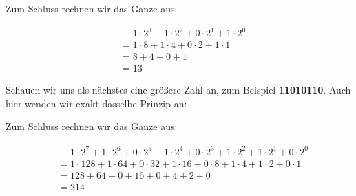 \documentclass{article}
\begin{document}
Zum Schluss rechnen wir das Ganze aus:

\begin{center}
\begin{align*}
  &\phantom{= } 1 \cdot 2^3 + 1 \cdot 2^2 + 0 \cdot 2^1 + 1 \cdot 2^0 \\
  &= 1 \cdot 8 + 1 \cdot 4 + 0 \cdot 2 + 1 \cdot 1 \\
  &= 8 + 4 + 0 + 1 \\
  &= 13
\end{align*}
\end{center}


Schauen wir uns als nächstes eine größere Zahl an, zum Beispiel \textbf{11010110}. Auch hier wenden wir exakt dasselbe Prinzip an:

\begin{center}
\end{center}

Zum Schluss rechnen wir das Ganze aus:

\begin{center}
\begin{align*}
  &\phantom{= } 1 \cdot 2^7 +1 \cdot 2^6 + 0 \cdot 2^5 + 1 \cdot 2^4 + 0 \cdot 2^3 + 1 \cdot 2^2 + 1 \cdot 2^1 + 0 \cdot 2^0 \\
  &= 1 \cdot 128 + 1 \cdot 64 + 0 \cdot 32 + 1 \cdot 16 + 0 \cdot 8 + 1 \cdot 4 + 1 \cdot 2 + 0 \cdot 1 \\
  &= 128 + 64 + 0 + 16 + 0 + 4 + 2 + 0 \\
  &= 214
\end{align*}
\end{center}
\end{document}

